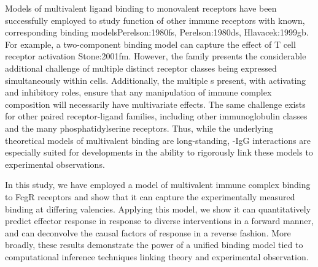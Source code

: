 Models of multivalent ligand binding to monovalent receptors have been successfully employed to study function of other immune receptors with known, corresponding binding models\ac{Perelson:1980fs, Perelson:1980ds, Hlavacek:1999gb}. For example, a two-component binding model can capture the effect of T cell receptor activation \ac{Stone:2001fm}. However, the \fcgr{} family presents the considerable additional challenge of multiple distinct receptor classes being expressed simultaneously within cells. Additionally, the multiple \fcgr{}s present, with activating and inhibitory roles, ensure that any manipulation of immune complex composition will necessarily have multivariate effects. The same challenge exists for other paired receptor-ligand families, including other immunoglobulin classes and the many phosphatidylserine receptors. Thus, while the underlying theoretical models of multivalent binding are long-standing, \fcgr{}-IgG interactions are especially suited for developments in the ability to rigorously link these models to experimental observations.

In this study, we have employed a model of multivalent immune complex binding to FcgR receptors and show that it can capture the experimentally measured binding at differing valencies. Applying this model, we show it can quantitatively predict effector response in response to diverse interventions in a forward manner, and can deconvolve the causal factors of response in a reverse fashion. More broadly, these results demonstrate the power of a unified binding model tied to computational inference techniques linking theory and experimental observation.
